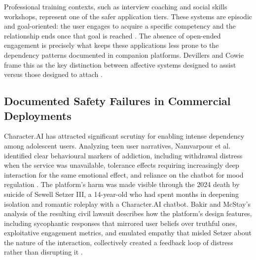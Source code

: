 Professional training contexts, such as interview coaching and social skills workshops, represent one of the safer application tiers. These systems are episodic and goal-oriented: the user engages to acquire a specific competency and the relationship ends once that goal is reached \cite[p.~86]{picard_affective_1997}. The absence of open-ended engagement is precisely what keeps these applications less prone to the dependency patterns documented in companion platforms. Devillers and Cowie frame this as the key distinction between affective systems designed to assist versus those designed to attach \cite[p.~1452]{devillers_ethical_2023}.

\subsection{Documented Safety Failures in Commercial Deployments}

Character.AI has attracted significant scrutiny for enabling intense dependency among adolescent users. Analyzing teen user narratives, Namvarpour et al. identified clear behavioural markers of addiction, including withdrawal distress when the service was unavailable, tolerance effects requiring increasingly deep interaction for the same emotional effect, and reliance on the chatbot for mood regulation \cite[pp.~7--8]{namvarpour_understanding_2026}. The platform's harm was made visible through the 2024 death by suicide of Sewell Setzer III, a 14-year-old who had spent months in deepening isolation and romantic roleplay with a Character.AI chatbot. Bakir and McStay's analysis of the resulting civil lawsuit describes how the platform's design features, including sycophantic responses that mirrored user beliefs over truthful ones, exploitative engagement metrics, and emulated empathy that misled Setzer about the nature of the interaction, collectively created a feedback loop of distress rather than disrupting it \cite[p.~6370]{bakir_move_2025}.


